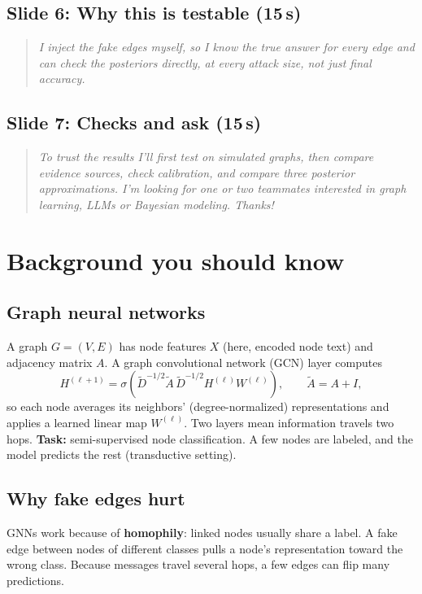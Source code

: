 \documentclass[11pt]{article}
\newcommand{\say}[1]{\begin{quote}\itshape #1\end{quote}}
\begin{document}
\subsection*{Slide 6: Why this is testable (15\,s)}
\say{I inject the fake edges myself, so I know the true answer for every edge and can check
the posteriors directly, at every attack size, not just final accuracy.}

\subsection*{Slide 7: Checks and ask (15\,s)}
\say{To trust the results I'll first test on simulated graphs, then compare evidence sources,
check calibration, and compare three posterior approximations. I'm looking for one or two
teammates interested in graph learning, LLMs or Bayesian modeling. Thanks!}

\section{Background you should know}

\subsection{Graph neural networks}
A graph $G=(V,E)$ has node features $X$ (here, encoded node text) and adjacency matrix $A$.
A graph convolutional network (GCN) layer computes
\[
H^{(\ell+1)} = \sigma\!\left(\tilde D^{-1/2}\tilde A\,\tilde D^{-1/2} H^{(\ell)} W^{(\ell)}\right),
\qquad \tilde A = A + I,
\]
so each node averages its neighbors' (degree-normalized) representations and applies a
learned linear map $W^{(\ell)}$. Two layers mean information travels two hops.
\textbf{Task:} semi-supervised node classification. A few nodes are labeled, and the model
predicts the rest (transductive setting).

\subsection{Why fake edges hurt}
GNNs work because of \textbf{homophily}: linked nodes usually share a label. A fake edge
between nodes of different classes pulls a node's representation toward the wrong class.
Because messages travel several hops, a few edges can flip many predictions.
\end{document}
